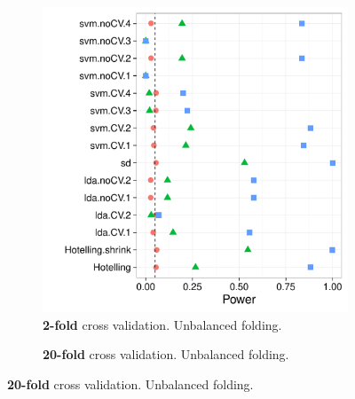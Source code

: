 \documentclass[12pt,a4paper]{article}
\newcommand{\mycaption}{Simulation details in Appendix~\ref{apx:simulation_details} except the changes in the sub-captions.}
\begin{document}
\begin{figure}[h]
\centering
\caption{\mycaption}	
\label{fig:n_folds_unbalanced}
	\begin{subfigure}{.5\textwidth}
	  \centering
	  \includegraphics[width=1\linewidth]{"art/2016-08-05 09:37:35"}
	  \caption{\textbf{2-fold} cross validation. Unbalanced folding.} 
	\label{fig:n_folds_unbalanced_1}
	\end{subfigure}%
	\begin{subfigure}{.5\textwidth}
	  \centering
	  \caption{\textbf{20-fold} cross validation. Unbalanced folding.} 
	\label{fig:n_folds_unbalanced_2}
	\end{subfigure}
\end{figure}
\end{document}
